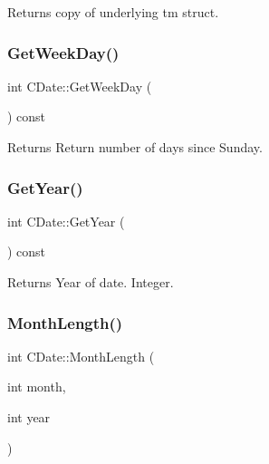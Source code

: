 \begin{DoxyReturn}{Returns}
copy of underlying tm struct. 
\end{DoxyReturn}
\mbox{\label{class_c_date_abef71ae78644a73ae1277680c93c0442}} 
\subsubsection{\texorpdfstring{Get\+Week\+Day()}{GetWeekDay()}}
{\footnotesize\ttfamily int C\+Date\+::\+Get\+Week\+Day (\begin{DoxyParamCaption}{ }\end{DoxyParamCaption}) const\hspace{0.3cm}{\ttfamily [inline]}}

\begin{DoxyReturn}{Returns}
Return number of days since Sunday. 
\end{DoxyReturn}
\mbox{\label{class_c_date_a27e6152eadf6eeb8aded10c7bbc30660}} 
\subsubsection{\texorpdfstring{Get\+Year()}{GetYear()}}
{\footnotesize\ttfamily int C\+Date\+::\+Get\+Year (\begin{DoxyParamCaption}{ }\end{DoxyParamCaption}) const\hspace{0.3cm}{\ttfamily [inline]}}

\begin{DoxyReturn}{Returns}
Year of date. Integer. 
\end{DoxyReturn}
\mbox{\label{class_c_date_a5cba42ef155816c8d374d50e8149800d}} 
\subsubsection{\texorpdfstring{Month\+Length()}{MonthLength()}}
{\footnotesize\ttfamily int C\+Date\+::\+Month\+Length (\begin{DoxyParamCaption}\item[{int}]{month,  }\item[{int}]{year }\end{DoxyParamCaption})\hspace{0.3cm}{\ttfamily [static]}}


